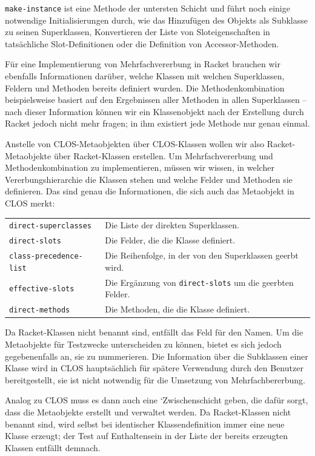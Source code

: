 \texttt{make-instance} ist eine Methode der untersten Schicht und führt noch einige notwendige Initialisierungen durch, wie das Hinzufügen des Objekts als Subklasse zu seinen Superklassen, Konvertieren der Liste von Sloteigenschaften in tatsächliche Slot-Definitionen oder die Definition von Accessor-Methoden. 

Für eine Implementierung von Mehrfachvererbung in Racket brauchen wir ebenfalls Informationen darüber, welche Klassen mit welchen Superklassen, Feldern und Methoden bereits definiert wurden. Die Methodenkombination beispielsweise basiert auf den Ergebnissen aller Methoden in allen Superklassen -- nach dieser Information können wir ein Klassenobjekt nach der Erstellung durch Racket jedoch nicht mehr fragen; in ihm existiert jede Methode nur genau einmal.

Anstelle von CLOS-Metaobjekten über CLOS-Klassen wollen wir also Racket-Metaobjekte über Racket-Klassen erstellen. Um Mehrfachvererbung und Methodenkombination zu implementieren, müssen wir wissen, in welcher Vererbungshierarchie die Klassen stehen und welche Felder und Methoden sie definieren. Das sind genau die Informationen, die sich auch das Metaobjekt in CLOS merkt:

\begin{tabular}{p{5cm}p{9cm}}
 \texttt{direct-superclasses} & Die Liste der direkten Superklassen. \\
 \texttt{direct-slots} & Die Felder, die die Klasse definiert. \\
 \texttt{class-precedence-list} & Die Reihenfolge, in der von den Superklassen geerbt wird.\\
 \texttt{effective-slots} & Die Ergänzung von \texttt{direct-slots} um die geerbten Felder. \\
 \texttt{direct-methods} & Die Methoden, die die Klasse definiert.
\end{tabular}

Da Racket-Klassen nicht benannt sind, entfällt das Feld für den Namen. Um die Metaobjekte für Testzwecke unterscheiden zu können, bietet es sich jedoch gegebenenfalls an, sie zu nummerieren. Die Information über die Subklassen einer Klasse wird in CLOS hauptsächlich für spätere Verwendung durch den Benutzer bereitgestellt, sie ist nicht notwendig für die Umsetzung von Mehrfachbererbung. 

Analog zu CLOS muss es dann auch eine `Zwischenschicht geben, die dafür sorgt, dass die Metaobjekte erstellt und verwaltet werden. Da Racket-Klassen nicht benannt sind, wird selbst bei identischer Klassendefinition immer eine neue Klasse erzeugt; der Test auf Enthaltensein in der Liste der bereits erzeugten Klassen entfällt demnach.

